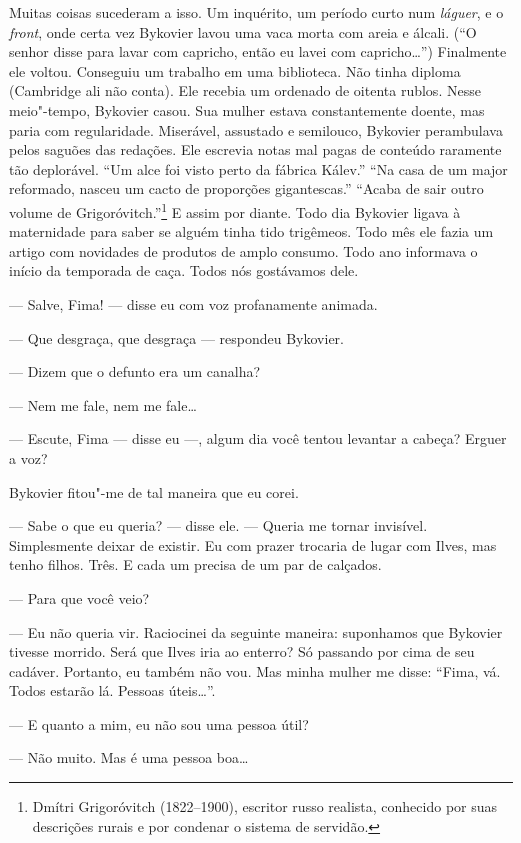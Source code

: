 Muitas coisas sucederam a isso. Um inquérito, um período curto num
\emph{láguer}, e o \emph{front}, onde certa vez Bykovier lavou uma vaca
morta com areia e álcali. (``O senhor disse para lavar com capricho,
então eu lavei com capricho\ldots{}'') Finalmente ele voltou. Conseguiu um
trabalho em uma biblioteca. Não tinha diploma (Cambridge ali não conta).
Ele recebia um ordenado de oitenta rublos. Nesse meio"-tempo, Bykovier
casou. Sua mulher estava constantemente doente, mas paria com
regularidade. Miserável, assustado e semilouco, Bykovier perambulava
pelos saguões das redações. Ele escrevia notas mal pagas de conteúdo
raramente tão deplorável. ``Um alce foi visto perto da fábrica Kálev.''
``Na casa de um major reformado, nasceu um cacto de proporções
gigantescas.'' ``Acaba de sair outro volume de Grigoróvitch.''\footnote{Dmítri
  Grigoróvitch (1822--1900), escritor russo realista, conhecido por suas
  descrições rurais e por condenar o sistema de servidão.} E assim por
diante. Todo dia Bykovier ligava à maternidade para saber se alguém
tinha tido trigêmeos. Todo mês ele fazia um artigo com novidades de
produtos de amplo consumo. Todo ano informava o início da temporada de
caça. Todos nós gostávamos dele.

--- Salve, Fima! --- disse eu com voz profanamente animada.

--- Que desgraça, que desgraça --- respondeu Bykovier.

--- Dizem que o defunto era um canalha?

--- Nem me fale, nem me fale\ldots{}

--- Escute, Fima --- disse eu ---, algum dia você tentou levantar a
cabeça? Erguer a voz?

Bykovier fitou"-me de tal maneira que eu corei.

--- Sabe o que eu queria? --- disse ele. --- Queria me tornar invisível.
Simplesmente deixar de existir. Eu com prazer trocaria de lugar com
Ilves, mas tenho filhos. Três. E cada um precisa de um par de calçados.

--- Para que você veio?

--- Eu não queria vir. Raciocinei da seguinte maneira: suponhamos que
Bykovier tivesse morrido. Será que Ilves iria ao enterro? Só passando
por cima de seu cadáver. Portanto, eu também não vou. Mas minha mulher
me disse: ``Fima, vá. Todos estarão lá. Pessoas úteis\ldots{}''.

--- E quanto a mim, eu não sou uma pessoa útil?

--- Não muito. Mas é uma pessoa boa\ldots{}

